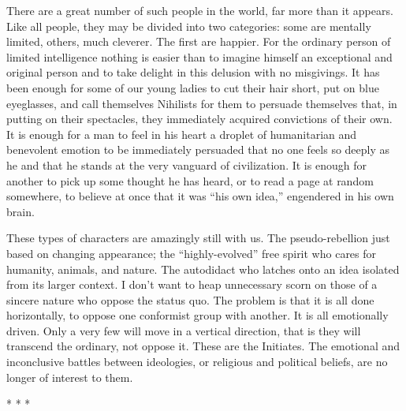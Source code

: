 \begin{quotex}
There are a great number of such people in the world, far more than it appears. Like all people, they may be divided into two categories: some are mentally limited, others, much cleverer. The first are happier. For the ordinary person of limited intelligence nothing is easier than to imagine himself an exceptional and original person and to take delight in this delusion with no misgivings. It has been enough for some of our young ladies to cut their hair short, put on blue eyeglasses, and call themselves Nihilists for them to persuade themselves that, in putting on their spectacles, they immediately acquired convictions of their own. It is enough for a man to feel in his heart a droplet of humanitarian and benevolent emotion to be immediately persuaded that no one feels so deeply as he and that he stands at the very vanguard of civilization. It is enough for another to pick up some thought he has heard, or to read a page at random somewhere, to believe at once that it was ``his own idea,'' engendered in his own brain.
\end{quotex}


These types of characters are amazingly still with us. The pseudo-rebellion just based on changing appearance; the ``highly-evolved'' free spirit who cares for humanity, animals, and nature. The autodidact who latches onto an idea isolated from its larger context. I don't want to heap unnecessary scorn on those of a sincere nature who oppose the status quo. The problem is that it is all done horizontally, to oppose one conformist group with another. It is all emotionally driven. Only a very few will move in a vertical direction, that is they will transcend the ordinary, not oppose it. These are the Initiates. The emotional and inconclusive battles between ideologies, or religious and political beliefs, are no longer of interest to them.



\begin{center}* * *\end{center}


